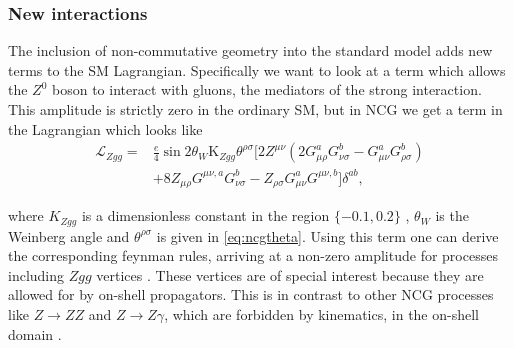\subsubsection{New interactions}
The inclusion of non-commutative geometry into the standard model adds new terms to the SM Lagrangian. Specifically we want to look at a term which allows the $Z^0$ boson to interact with gluons, the mediators of the strong interaction. This amplitude is strictly zero in the ordinary SM, but in NCG we get a term in the Lagrangian which looks like \cite{melic2005smn}
\begin{align} \label{eq:zggterm}
	\mathcal{L}_{Zgg} = &\frac{e}{4}\sin{2\theta_W}\textrm{K}_{Zgg}\theta^{\rho\sigma}
	[2 Z^{\mu\nu} (2 G_{\mu\rho}^a G_{\nu\sigma}^b - G_{\mu\nu}^a G_{\rho\sigma}^b) \nonumber \\
	 &+ 8 Z_{\mu\rho} G^{\mu\nu,a} G_{\nu\sigma}^b - Z_{\rho\sigma} G_{\mu\nu}^a G^{\mu\nu,b}
	] \delta^{ab},
\end{align}

where $K_{Zgg}$ is a dimensionless constant in the region $\{-0.1,0.2\}$ \cite{behr2003dnc}, $\theta_W$ is the Weinberg angle and $\theta^{\rho\sigma}$ is given in \eqref{eq:ncgtheta}. Using this term one can derive the corresponding feynman rules, arriving at a non-zero amplitude for processes including $Zgg$ vertices \cite{melic2005smn}. These vertices are of special interest because they are allowed for by on-shell propagators. This is in contrast to other NCG processes like $Z \rightarrow ZZ$ and $Z \rightarrow Z\gamma$, which are forbidden by kinematics, in the on-shell domain \cite{behr2003dnc}.